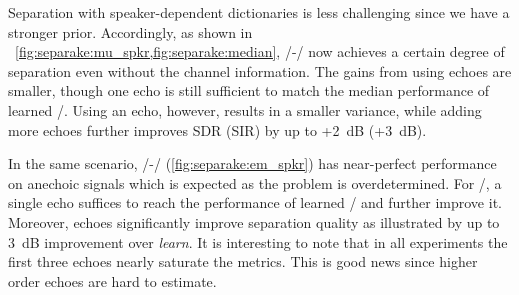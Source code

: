 \mynewline
Separation with speaker-dependent dictionaries is less challenging since we have a stronger prior.
Accordingly, as shown in ~\cref{fig:separake:mu_spkr,fig:separake:median}, \MU/-\NMF/ now achieves a certain degree of separation even without the channel information.
The gains from using echoes are smaller, though one echo is still sufficient to match the median performance of learned \RTFs/.
Using an echo, however, results in a smaller variance, while adding more echoes further improves \ac{SDR} (\ac{SIR}) by up to +2~dB (+3~dB).

\mynewline
In the same scenario, \EM/-\NMF/ (\cref{fig:separake:em_spkr}) has near-perfect performance on anechoic signals which is expected as the problem is overdetermined.
For \MU/, a single echo suffices to reach the performance of learned \RTFs/ and further improve it.
Moreover, echoes significantly improve separation quality as illustrated by up to 3~dB improvement over \textit{learn}.
It is interesting to note that in all experiments the first three echoes nearly saturate the metrics.
This is good news since higher order echoes are hard to estimate.

